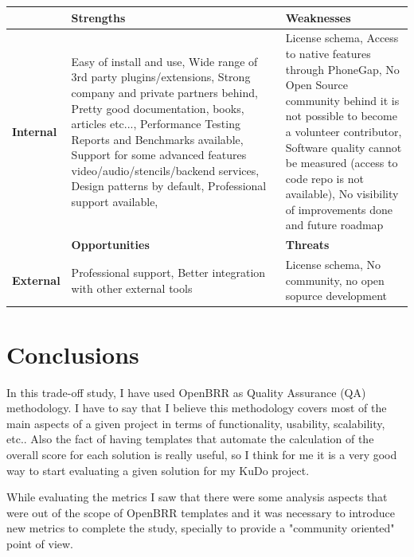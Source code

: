 \documentclass[a4paper,12pt]{book}
\begin{document}
\begin{center}
    \begin{tabular}{ | p{1.7cm} | p{6cm} | p{6cm} |}
    \hline
    & \textbf{Strengths} & \textbf{Weaknesses} \\ \hline
    \textbf{Internal} & 
    Easy of install and use, %
    Wide range of 3rd party plugins/extensions,
    Strong company and private partners behind,
    Pretty good documentation, books, articles etc...,
    Performance Testing Reports and Benchmarks available,
    Support for some advanced features video/audio/stencils/backend services,
    Design patterns by default,
    Professional support available,
    & License schema, %
    Access to native features through PhoneGap, 
    No Open Source community behind it is not possible to become a volunteer contributor,
    Software quality cannot be measured (access to code repo is not available),
    No visibility of improvements done and future roadmap\\ \hline
    & \textbf{Opportunities} & \textbf{Threats} \\ \hline
    \textbf{External}  
    & Professional support, %
    Better integration with other external tools
    & License schema, %
    No community, no open sopurce development\\ \hline
    \end{tabular}
\end{center}


\chapter{Conclusions}
\label{chap:conclusions}

In this trade-off study, I have used OpenBRR as Quality Assurance (QA) methodology. I have to say that I believe this methodology covers most of the main aspects of a given project in terms of functionality, usability, scalability, etc.. Also the fact of having templates that automate the calculation of the overall score for each solution is really useful, so I think for me it is a very good way to start evaluating a given solution for my KuDo project.

While evaluating the metrics I saw that there were some analysis aspects that were out of the scope of OpenBRR templates and it was necessary to introduce new metrics to complete the study, specially to provide a "community oriented" point of view.
\end{document}
